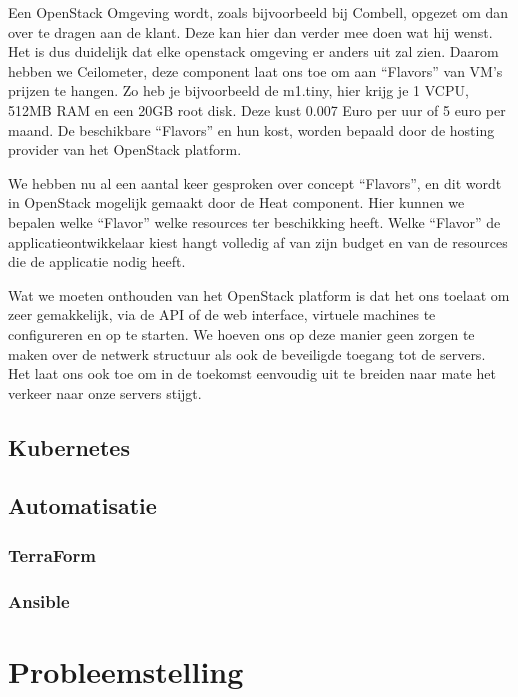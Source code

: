 Een OpenStack Omgeving wordt, zoals bijvoorbeeld bij Combell, opgezet om dan over te dragen aan de klant. Deze kan hier dan verder mee doen wat hij wenst. Het is dus duidelijk dat elke openstack omgeving er anders uit zal zien. Daarom hebben we Ceilometer, deze component laat ons toe om aan “Flavors” van VM’s prijzen te hangen. Zo heb je bijvoorbeeld de m1.tiny, hier krijg je 1 VCPU, 512MB RAM en een 20GB root disk. Deze kust 0.007 Euro per uur of 5 euro per maand. De beschikbare “Flavors” en hun kost, worden bepaald door de hosting provider van het OpenStack platform.

We hebben nu al een aantal keer gesproken over concept “Flavors”, en dit wordt in OpenStack mogelijk gemaakt door de Heat component. Hier kunnen we bepalen welke “Flavor” welke resources ter beschikking heeft. Welke “Flavor” de applicatieontwikkelaar kiest hangt volledig af van zijn budget en van de resources die de applicatie nodig heeft.

Wat we moeten onthouden van het OpenStack platform is dat het ons toelaat om zeer gemakkelijk, via de API of de web interface, virtuele machines te configureren en op te starten. We hoeven ons op deze manier geen zorgen te maken over de netwerk structuur als ook de beveiligde toegang tot de servers. Het laat ons ook toe om in de toekomst eenvoudig uit te breiden naar mate het verkeer naar onze servers stijgt.


\subsection{Kubernetes}

\subsection{Automatisatie}

\subsubsection{TerraForm}





\subsubsection{Ansible}

\section{Probleemstelling}

